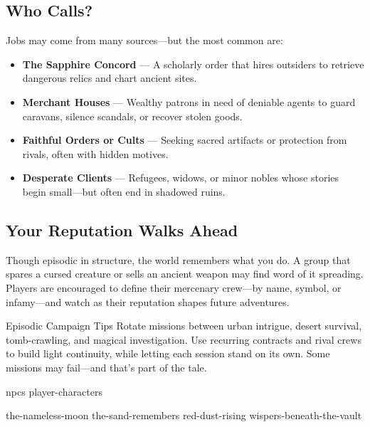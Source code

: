 \subsection*{Who Calls?}

Jobs may come from many sources—but the most common are:

\begin{itemize}
    \item \textbf{The Sapphire Concord} — A scholarly order that hires outsiders to retrieve dangerous relics and chart ancient sites.
    \item \textbf{Merchant Houses} — Wealthy patrons in need of deniable agents to guard caravans, silence scandals, or recover stolen goods.
    \item \textbf{Faithful Orders or Cults} — Seeking sacred artifacts or protection from rivals, often with hidden motives.
    \item \textbf{Desperate Clients} — Refugees, widows, or minor nobles whose stories begin small—but often end in shadowed ruins.
\end{itemize}

\vspace{0.5\baselineskip}
\subsection*{Your Reputation Walks Ahead}

Though episodic in structure, the world remembers what you do. A group that spares a cursed creature or sells an ancient weapon may find word of it spreading. Players are encouraged to define their mercenary crew—by name, symbol, or infamy—and watch as their reputation shapes future adventures.

\begin{CommentBox}{Episodic Campaign Tips}
    Rotate missions between urban intrigue, desert survival, tomb-crawling, and magical investigation. Use recurring contracts and rival crews to build light continuity, while letting each session stand on its own. Some missions may fail—and that’s part of the tale.
\end{CommentBox}


{npcs}
{player-characters}


{the-nameless-moon}
{the-sand-remembers}
{red-dust-rising}
{wispers-beneath-the-vault}






